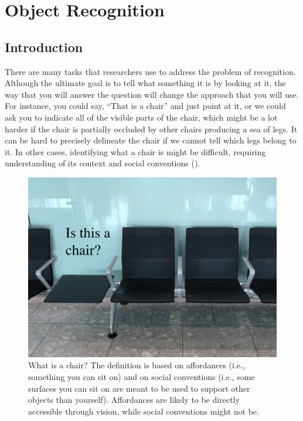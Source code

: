 

\chapter{Object Recognition}

\label{chapter:object_recognition}





\section{Introduction}

There are many tasks that researchers use to address  the problem of recognition. Although  the ultimate goal is to tell what something it is by looking at it, the way that you will answer the question will change the approach that you will use. For instance, you could say, ``That is a chair'' and just point at it, or we could ask you to indicate all of the visible parts of the chair, which might be a lot harder if the chair is partially occluded by other chairs producing a sea of legs. It can be hard to precisely delineate the chair if we cannot tell which legs belong to it. In other cases, identifying what a chair is might be difficult, requiring understanding of its context and social conventions (\fig{\ref{fig:what_is_a_chair_with_text}}).  

  
\begin{figure}[h]
\centerline{
\includegraphics[width=0.5\linewidth]{figures/object_recognition/what_is_a_chair_with_text.jpg}
}
\caption{What is a chair? The definition is based on affordances (i.e., something you can sit on) and on social conventions (i.e., some surfaces you can sit on are meant to be used to support other objects than yourself). Affordances are likely to be directly accessible through vision, while social conventions might not be.}
\label{fig:what_is_a_chair_with_text}
\end{figure}

